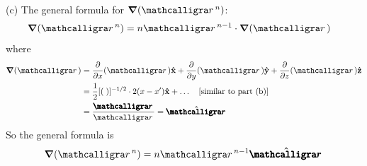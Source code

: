 \documentclass[../main.tex]{subfiles}
\begin{document}
(c) The general formula for $\grad(\scriptr^n)$:
\begin{align*}
    \grad(\scriptr^n) &=
    n \scriptr^{n-1} \cdot \grad{(\scriptr)}
\end{align*}
where
\begin{align*}
    \grad{(\scriptr)} &= \pdv{x}(\scriptr) \vu{x} + \pdv{y}(\scriptr) \vu{y} + \pdv{z}(\scriptr) \vu{z} \\
    &= \frac{1}{2} [(\;)]^{-1/2} \cdot 2(x - x') \vu{x} + \dots \qqtext{[similar to part (b)]} \\
    &= \frac{\boldscriptr}{\scriptr} = \vu{\boldscriptr}
\end{align*}
So the general formula is
\begin{align*}
    \grad(\scriptr^n) = n \scriptr^{n-1} \vu{\boldscriptr}
\end{align*}
\end{document}
